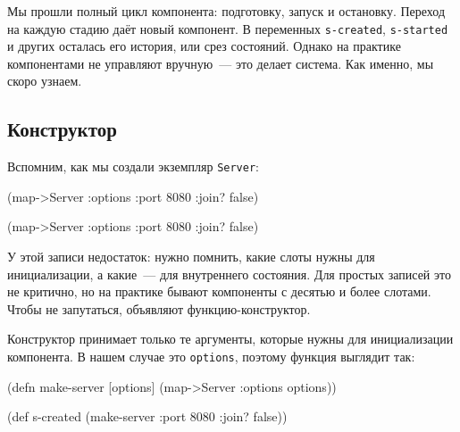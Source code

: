 \fi

Мы прошли полный цикл компонента: подготовку, запуск и остановку. Переход на
каждую стадию даёт новый компонент. В переменных \verb|s-created|,
\verb|s-started| и других осталась его история, или срез состояний. Однако на
практике компонентами не управляют вручную~--- это делает система. Как именно,
мы скоро узнаем.

\subsection{Конструктор}


Вспомним, как мы создали экземпляр \verb|Server|:

\ifnarrow

\begin{english}
  \begin{clojure}
(map->Server
  {:options {:port 8080
             :join? false}})
  \end{clojure}
\end{english}

\else

\begin{english}
  \begin{clojure}
(map->Server {:options {:port 8080 :join? false}})
  \end{clojure}
\end{english}

\fi


У этой записи недостаток: нужно помнить, какие слоты нужны для инициализации, а
какие~--- для внутреннего состояния. Для простых записей это не критично, но на
практике бывают компоненты с десятью и более слотами. Чтобы не запутаться,
объявляют функцию-конструктор.

Конструктор принимает только те аргументы, которые нужны для инициализации
компонента. В нашем случае это \verb|options|, поэтому функция выглядит так:

\ifnarrow

\begin{english}
  \begin{clojure}
(defn make-server
  [options]
  (map->Server {:options options}))

(def s-created
  (make-server {:port 8080
                :join? false}))
  \end{clojure}
\end{english}

